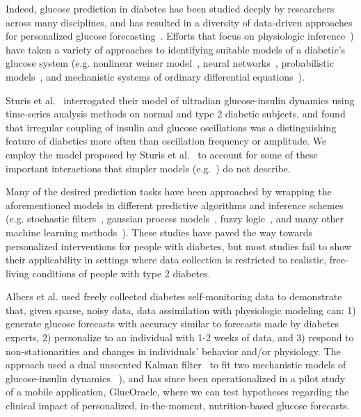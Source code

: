 \documentclass[10pt,letterpaper]{article}
\begin{document}
Indeed, glucose prediction in diabetes has been studied deeply by researchers across many disciplines, and has resulted in a diversity of data-driven approaches for personalized glucose forecasting~\cite{marmarelis_data-driven_2014, funatsu_glucose_2011}. Efforts that focus on physiologic inference~\cite{vahidi_detection_2015,beverlin_algorithm_2011,vahidi_comprehensive_2015,dalla_man}) have taken a variety of approaches to identifying suitable models of a diabetic's glucose system (e.g. nonlinear weiner model~\cite{rollins_free-living_2010,beverlin_algorithm_2011,kotz_multiple-input_2014}, neural networks~\cite{zitar_towards_2005}, probabilistic models~\cite{murata_gh_probabilistic_2004}, and mechanistic systems of ordinary differential equations~\cite{dalla_man,vahidi_comprehensive_2015}).

Sturis et al.~\cite{sturis_abnormalities_1992} interrogated their model of ultradian glucose-insulin dynamics using time-series analysis methods on normal and type 2 diabetic subjects, and found that irregular coupling of insulin and glucose oscillations was a distinguishing feature of diabetics more often than oscillation frequency or amplitude. We employ the model proposed by Sturis et al.~\cite{sturisUltradian} to account for some of these important interactions that simpler models (e.g.~\cite{bergman_physiologic_1981}) do not describe.

Many of the desired prediction tasks have been approached by wrapping the aforementioned models in different predictive algorithms and inference schemes (e.g. stochastic filters~\cite{barazandegan_assessment_2014}, gaussian process models~\cite{valletta_gaussian_2009}, fuzzy logic~\cite{ekram_feedback_2012}, and many other machine learning methods~\cite{sudharsan_hypoglycemia_2015,funatsu_glucose_2011,plis_machine_2014,gibson_development_2013}). These studies have paved the way towards personalized interventions for people with diabetes, but most studies fail to show their applicability in settings where data collection is  restricted to realistic, free-living conditions of people with type 2 diabetes. 

Albers et al. used freely collected diabetes self-monitoring data to demonstrate that, given sparse, noisy data, data assimilation with physiologic modeling can: 1) generate glucose forecasts with accuracy similar to forecasts made by diabetes experts, 2) personalize to an individual with 1-2 weeks of data, and 3) respond to non-stationarities and changes in individuals' behavior and/or physiology. The approach used a dual unscented Kalman filter~\cite{julier_unscented_2004} to fit two mechanistic models of glucose-insulin dynamics ~\cite{dalla_man,sturisUltradian}), and has since been operationalized in a pilot study of a mobile application, GlucOracle, where we can test hypotheses regarding the clinical impact of personalized, in-the-moment, nutrition-based glucose forecasts.
\end{document}
